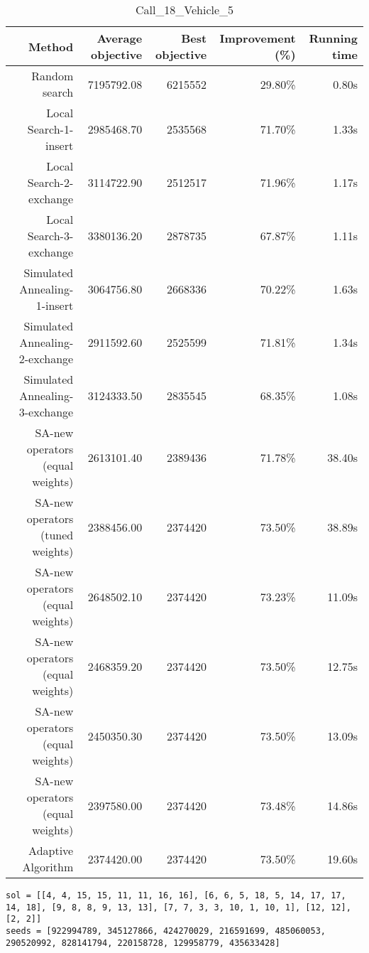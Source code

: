 \begin{table}[ht]
\centering
\caption{Call\_18\_Vehicle\_5}
\label{tab:call18vehicle5}
\begin{tabular}{|r|r|r|r|r|}
Method & Average objective & Best objective & Improvement (\%) & Running time \\
\hline
Random search & 7195792.08 & 6215552 & 29.80\% & 0.80s\\
Local Search-1-insert & 2985468.70 & 2535568 & 71.70\% & 1.33s\\
Local Search-2-exchange & 3114722.90 & 2512517 & 71.96\% & 1.17s\\
Local Search-3-exchange & 3380136.20 & 2878735 & 67.87\% & 1.11s\\
Simulated Annealing-1-insert & 3064756.80 & 2668336 & 70.22\% & 1.63s\\
Simulated Annealing-2-exchange & 2911592.60 & 2525599 & 71.81\% & 1.34s\\
Simulated Annealing-3-exchange & 3124333.50 & 2835545 & 68.35\% & 1.08s\\
SA-new operators (equal weights) & 2613101.40 & 2389436 & 71.78\% & 38.40s\\
SA-new operators (tuned weights) & 2388456.00 & 2374420 & 73.50\% & 38.89s\\
SA-new operators (equal weights) & 2648502.10 & 2374420 & 73.23\% & 11.09s\\
SA-new operators (equal weights) & 2468359.20 & 2374420 & 73.50\% & 12.75s\\
SA-new operators (equal weights) & 2450350.30 & 2374420 & 73.50\% & 13.09s\\
SA-new operators (equal weights) & 2397580.00 & 2374420 & 73.48\% & 14.86s\\
Adaptive Algorithm & 2374420.00 & 2374420 & 73.50\% & 19.60s\\
\end{tabular}%
\end{table}
\begin{lstlisting}[label={lst:call18vehicle5},caption=Optimal solution call\_18\_vehicle\_5]
sol = [[4, 4, 15, 15, 11, 11, 16, 16], [6, 6, 5, 18, 5, 14, 17, 17, 14, 18], [9, 8, 8, 9, 13, 13], [7, 7, 3, 3, 10, 1, 10, 1], [12, 12], [2, 2]]
seeds = [922994789, 345127866, 424270029, 216591699, 485060053, 290520992, 828141794, 220158728, 129958779, 435633428]
\end{lstlisting}%
\clearpage


